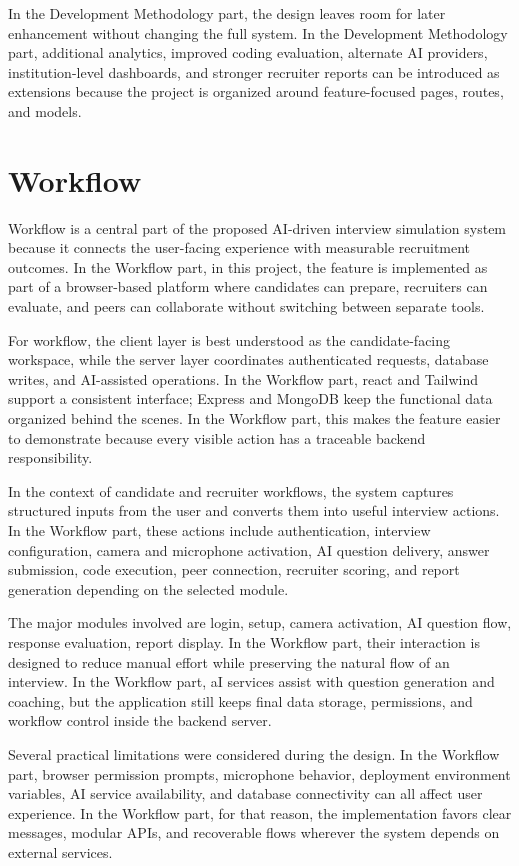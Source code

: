 \documentclass[12pt,a4paper]{report}
\begin{document}
In the Development Methodology part, the design leaves room for later enhancement without changing the full system. In the Development Methodology part, additional analytics, improved coding evaluation, alternate AI providers, institution-level dashboards, and stronger recruiter reports can be introduced as extensions because the project is organized around feature-focused pages, routes, and models.


\section{Workflow}

Workflow is a central part of the proposed AI-driven interview simulation system because it connects the user-facing experience with measurable recruitment outcomes. In the Workflow part, in this project, the feature is implemented as part of a browser-based platform where candidates can prepare, recruiters can evaluate, and peers can collaborate without switching between separate tools.


For workflow, the client layer is best understood as the candidate-facing workspace, while the server layer coordinates authenticated requests, database writes, and AI-assisted operations. In the Workflow part, react and Tailwind support a consistent interface; Express and MongoDB keep the functional data organized behind the scenes. In the Workflow part, this makes the feature easier to demonstrate because every visible action has a traceable backend responsibility.


In the context of candidate and recruiter workflows, the system captures structured inputs from the user and converts them into useful interview actions. In the Workflow part, these actions include authentication, interview configuration, camera and microphone activation, AI question delivery, answer submission, code execution, peer connection, recruiter scoring, and report generation depending on the selected module.


The major modules involved are login, setup, camera activation, AI question flow, response evaluation, report display. In the Workflow part, their interaction is designed to reduce manual effort while preserving the natural flow of an interview. In the Workflow part, aI services assist with question generation and coaching, but the application still keeps final data storage, permissions, and workflow control inside the backend server.


Several practical limitations were considered during the design. In the Workflow part, browser permission prompts, microphone behavior, deployment environment variables, AI service availability, and database connectivity can all affect user experience. In the Workflow part, for that reason, the implementation favors clear messages, modular APIs, and recoverable flows wherever the system depends on external services.
\end{document}
